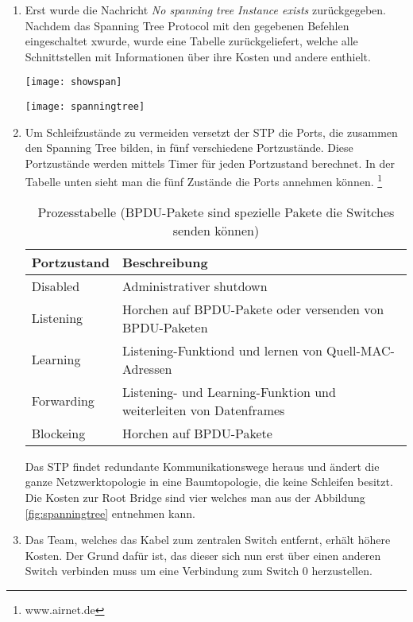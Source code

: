 \documentclass{scrartcl}
\begin{document}
  \renewcommand{\labelenumi}{\alph{enumi})}
  \begin{enumerate}
  \item
  Erst wurde die Nachricht \textit{No spanning tree Instance exists} zurückgegeben. Nachdem das Spanning Tree Protocol mit den gegebenen Befehlen eingeschaltet xwurde, wurde eine Tabelle zurückgeliefert, welche alle Schnittstellen mit Informationen über ihre Kosten und andere enthielt. 
  
    \texttt{[image: showspan]}
    \label{fig:showspan}
  
    \texttt{[image: spanningtree]}
    \label{fig:spanningtree}
  
  \item
  Um Schleifzustände zu vermeiden versetzt der STP die Ports, die zusammen den Spanning Tree bilden, in fünf verschiedene Portzustände. Diese Portzustände werden mittels Timer für jeden Portzustand berechnet. In der Tabelle unten sieht man die fünf Zustände die Ports annehmen können. \footnote{www.airnet.de}

  \begin{table}[htbp]
  \begin{tabular}{|l|l}
      \textbf{Portzustand} & \textbf{Beschreibung} \\ \hline
		 Disabled     & Administrativer shutdown \\
		 Listening    & Horchen auf BPDU-Pakete oder versenden von BPDU-Paketen \\
		 Learning     & Listening-Funktiond und lernen von Quell-MAC-Adressen \\
		 Forwarding & Listening- und Learning-Funktion und weiterleiten von Datenframes\\
        Blockeing    & Horchen auf BPDU-Pakete
    \end{tabular}
     \caption{Prozesstabelle (BPDU-Pakete sind spezielle Pakete die Switches senden können)}
     \end{table}
    
    Das STP findet redundante Kommunikationswege heraus und ändert die ganze Netzwerktopologie in eine Baumtopologie, die keine Schleifen besitzt. Die Kosten zur Root Bridge sind vier welches man aus der Abbildung \ref{fig:spanningtree} entnehmen kann.
    
    \item
    Das Team, welches das Kabel zum zentralen Switch entfernt, erhält höhere Kosten. Der Grund dafür ist, das dieser sich nun erst über einen anderen Switch verbinden muss um eine Verbindung zum Switch 0 herzustellen.
    

\end{enumerate}
\end{document}
